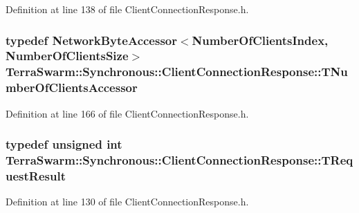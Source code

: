 Definition at line 138 of file Client\-Connection\-Response.\-h.

\hypertarget{class_terra_swarm_1_1_synchronous_1_1_client_connection_response_ac029cc8910297215aa037106589ec9c2}{
\subsubsection[{T\-Number\-Of\-Clients\-Accessor}]{\setlength{\rightskip}{0pt plus 5cm}typedef {\bf Network\-Byte\-Accessor}$<${\bf Number\-Of\-Clients\-Index}, {\bf Number\-Of\-Clients\-Size}$>$ {\bf Terra\-Swarm\-::\-Synchronous\-::\-Client\-Connection\-Response\-::\-T\-Number\-Of\-Clients\-Accessor}\hspace{0.3cm}{\ttfamily [private]}}}\label{class_terra_swarm_1_1_synchronous_1_1_client_connection_response_ac029cc8910297215aa037106589ec9c2}


Definition at line 166 of file Client\-Connection\-Response.\-h.

\hypertarget{class_terra_swarm_1_1_synchronous_1_1_client_connection_response_a4b55c1f852e288564e5aa00e882f80d5}{
\subsubsection[{T\-Request\-Result}]{\setlength{\rightskip}{0pt plus 5cm}typedef unsigned int {\bf Terra\-Swarm\-::\-Synchronous\-::\-Client\-Connection\-Response\-::\-T\-Request\-Result}}}\label{class_terra_swarm_1_1_synchronous_1_1_client_connection_response_a4b55c1f852e288564e5aa00e882f80d5}


Definition at line 130 of file Client\-Connection\-Response.\-h.


